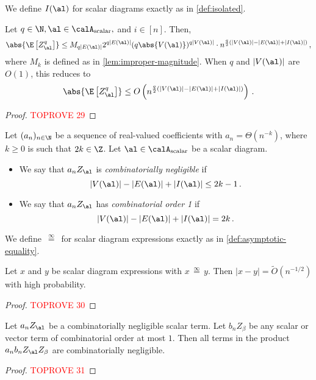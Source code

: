 \documentclass[12pt]{article}
\newcommand{\scalar}{\textnormal{scalar}}
\newcommand{\eqinf}{\,\overset{\infty}{=}\,}
\begin{document}
We define $I(\al)$ for scalar diagrams exactly as in \cref{def:isolated}.

\begin{lemma}\label{lem:improper-magnitude-scalar}
    Let $q\in\N, \al \in \calA_\scalar,$ and $i \in [n]$. Then,
    \[
        \abs{\E\left[Z_{\al}^q\right]} \leq M_{q|E(\al)|} 2^{q|E(\al)|}  (q\abs{V(\al)})^{q|V(\al)|} \cdot n^{\frac q 2\left(|V(\al)| - |E(\al)|+|I(\al)|\right)}\,,
    \]
    where $M_k$ is defined as in \cref{lem:improper-magnitude}.
    When $q$ and $|V(\al)|$ are $O(1)$, this reduces to
    \[
        \abs{\E\left[Z_{\al}^q\right]} \leq O\left( n^{\frac q 2\left(|V(\al)| - |E(\al)|+|I(\al)|\right)}\right)\,.
    \]
\end{lemma}

\begin{proof}\textcolor{red}{TOPROVE 29}\end{proof}

\begin{definition}
\label{def:combinatorially-negligible-scalar}
    Let $(a_n)_{n\in\N}$ be a sequence of real-valued coefficients with $a_n = \Theta(n^{-k})$, where $k\ge 0$ is such that $2k \in \Z$. Let $\al \in \calA_{\scalar}$ be a scalar diagram. 
    \begin{itemize}
    \item We say that $a_n Z_\al$ is \emph{combinatorially negligible}
    if
    \[|V(\al)| - |E(\al)| + |I(\al)| \leq 2k - 1\,.\]
    \item We say that $a_n Z_\al$ has \emph{combinatorial order 1} if
    \[|V(\al)| - |E(\al)| + |I(\al)| = 2k\,.\]
    \end{itemize}

    We define $\eqinf$ for scalar diagram expressions exactly as in \cref{def:asymptotic-equality}.
\end{definition}

\begin{lemma}\label{lem:almost-sure-scalar}
    Let $x$ and $y$ be scalar diagram expressions with $x\eqinf y$. Then $|x-y| = \widetilde{O}(n^{-1/2})$ with high probability.
\end{lemma}
\begin{proof}\textcolor{red}{TOPROVE 30}\end{proof}


\begin{lemma}\label{lem:comb-neg-scalar}
    Let $a_n Z_\al$ be a combinatorially negligible scalar term.
    Let $b_n Z_\beta$ be any scalar or vector term of combinatorial order at most $1$.
    Then all terms in the product $a_n b_n Z_\al Z_\beta$ are combinatorially negligible.
\end{lemma}
\begin{proof}\textcolor{red}{TOPROVE 31}\end{proof}
\end{document}
